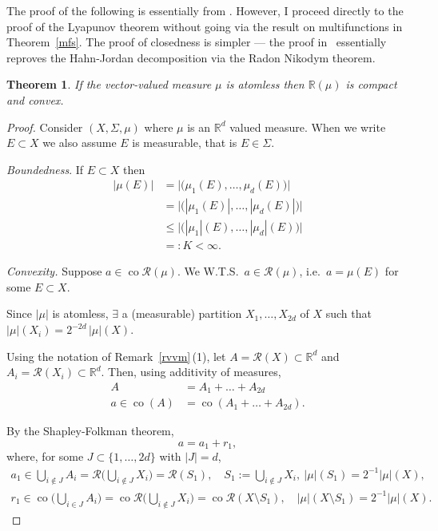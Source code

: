 \documentclass[a4paper]{amsart}
\theoremstyle{plain}
\newtheorem{theorem}{Theorem}[section]
\theoremstyle{definition}
\theoremstyle{remark}
\DeclareMathOperator{\co}{co}
\begin{document}
 
 The proof of the following is essentially from \cite{Tar}.  However, I proceed directly to the proof of the Lyapunov theorem without going via the result on multifunctions in Theorem~\ref{mfs}.  The proof of closedness is simpler --- the proof in~\cite{Tar} essentially reproves the Hahn-Jordan decomposition via the Radon Nikodym theorem.
 
 \begin{theorem} \label{liap} If the vector-valued measure $ \mu $ is atomless then $ \mathbb{R} (\mu) $ is compact and convex.
 \end{theorem}
 
 
 \begin{proof}  Consider  $ (X,\Sigma, \mu) $ where $ \mu $ is an $ \mathbb{R}^d   $ valued measure.  When we write $ E\subset X $ we also assume $ E $ is measurable, that is  $ E \in \Sigma$. 
 
 \bigskip
 \noindent \emph{Boundedness}.  If $ E \subset X $ then
 \begin{align*}
 |\mu(E)| &=  \Big| \big( \mu_1(E),\dots, \mu_d (E)\big) \Big| \\
    &=  \Big| \big( |\mu_1 (E)|,\dots, |\mu_d (E)|\big) \Big| \\
   &\leq \Big| \big(| \mu_1|(E),\dots, |\mu_d| (E)\big) \Big|  \\
   &=: K < \infty.
   \end{align*} 
   
\bigskip
\noindent \emph{Convexity.}  Suppose $ a\in \co \mathcal{R} (\mu) $.  We W.T.S.\ $ a \in \mathcal{R} (\mu) $, i.e.\ $ a = \mu (E) $ for some $ E\subset  X $.

Since $ |\mu | $ is atomless, $ \exists $ a (measurable) partition $ X_1,\dots, X_{2d} $ of $ X $ such that 
$ |\mu|(X_i) = 2^{-2d}\, |\mu| (X ) $.

Using the notation of Remark~\ref{rvvm}\,(1), let $ A = \mathcal{R} (X) \subset \mathbb{R}^d  $ and $ A_i = \mathcal{R} (X_i) \subset \mathbb{R}^d  $.  Then, using additivity of measures,
\begin{align*}
A &= A_1 + \dots + A_{2d} \\
a \in \co (A) &= \co( A_1 + \dots + A_{2d}).
\end{align*} 

By the Shapley-Folkman theorem,
\[
a = a_1 + r_1, 
\]
where, for some $ J \subset \{1,\dots, 2d\} $ with $ |J|= d$, 
\begin{gather*}
a_1 \in \bigcup_{i\notin J} A_i = \mathcal{R} \bigg( \bigcup_{i \notin J} X_i \bigg) = \mathcal{R} (S_1)
,\quad  S_1 := \bigcup_{i\notin J}X_i,\    |\mu|(S_1) = 2^{-1} |\mu|(X),            \\
r_1 \in \co \bigg(\bigcup_{i\in J} A_i \bigg)= \co \mathcal{R} \bigg( \bigcup_{i \notin J} X_i \bigg) = \co \mathcal{R} (X\setminus S_1),
\quad  |\mu|(X\setminus S_1) = 2^{-1} |\mu|(X).
\end{gather*}
 

\end{proof}
\end{document}
